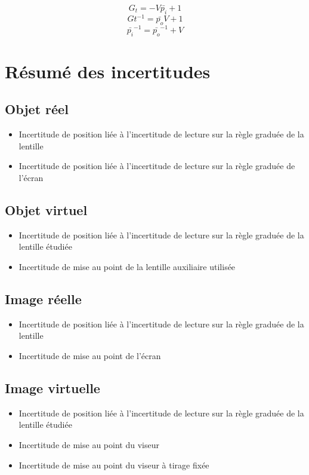 \documentclass[french]{yLectureNote}
\begin{document}
\begin{theorem}
  \[G_t = -V\bar{p_i}+1\]
  \[Gt^{-1} = \bar{p_o}V+1\]
  \[\bar{p_i}^{-1} = \bar{p_o}^{-1}+V\]
\end{theorem}
\section{Résumé des incertitudes}
\subsection{Objet réel}
\begin{itemize}
 \item Incertitude de position liée à l'incertitude de lecture sur la règle graduée de la lentille
 \item Incertitude de position liée à l'incertitude de lecture sur la règle graduée de l'écran
\end{itemize}
\subsection{Objet virtuel}
\begin{itemize}
 \item Incertitude de position liée à l'incertitude de lecture sur la règle graduée de la lentille étudiée
 \item Incertitude de mise au point de la lentille auxiliaire utilisée
\end{itemize}
\subsection{Image réelle}
\begin{itemize}
 \item Incertitude de position liée à l'incertitude de lecture sur la règle graduée de la lentille
 \item Incertitude de mise au point de l'écran
\end{itemize}
\subsection{Image virtuelle}
\begin{itemize}
 \item Incertitude de position liée à l'incertitude de lecture sur la règle graduée de la lentille étudiée
 \item Incertitude de mise au point du viseur
 \item Incertitude de mise au point du viseur à tirage fixée
\end{itemize}
\end{document}
